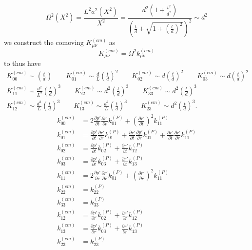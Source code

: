 \documentclass[10pt,letterpaper]{article}
\begin{document}
\begin{equation}
\Omega^2(X^2) = \frac{L^2 a^2(X^2)}{X^2} = \frac{d^2\left(1+\frac{t^2}{d^2}\right)}{\left(\frac{t}{d} + \sqrt{1+\left(\frac{t}{d}\right)^2 }\right)^2} \sim d^2
\end{equation}
we construct the comoving $K^{(cm)}_{\mu\nu}$ as
\begin{equation}
	K^{(cm)}_{\mu\nu} = \Omega^2 k^{(cm)}_{\mu\nu}
\end{equation}
to thus have 
\begin{align}
K^{(cm)}_{00} \sim  \left( \frac{t}{d}^{} \right) \qquad 
K^{(cm)}_{01} \sim  \frac{d}{L}\left( \frac{t}{d} \right)^{2} \qquad 
K^{(cm)}_{02} \sim  d\left( \frac{t}{d} \right)^{2} \qquad 
K^{(cm)}_{03} \sim  d\left( \frac{t}{d} \right)^{2}   \nonumber\\
K^{(cm)}_{11} \sim  \frac{d^2}{L^2}\left( \frac{t}{d} \right)^{3} \qquad 
K^{(cm)}_{22} \sim  d^2\left( \frac{t}{d} \right)^{3} \qquad 
K^{(cm)}_{33}  \sim  d^2\left( \frac{t}{d} \right)^{3} \nonumber\\
K^{(cm)}_{12} \sim  \frac{d^2}{L}\left( \frac{t}{d} \right)^{3} \qquad 
K^{(cm)}_{13} \sim  \frac{d^2}{L}\left( \frac{t}{d} \right)^{3} \qquad  
K^{(cm)}_{23} \sim d^2\left( \frac{t}{d} \right)^3 .
\end{align}
\newpage
\begin{align}
k^{(cm)}_{00} &= 2 \frac{\partial p'}{\partial t} \frac{\partial r'}{\partial t} k^{(P)}_{01} + \left(\frac{\partial r'}{\partial t}\right)^2 k^{(P)}_{11}\nonumber\\
k^{(cm)}_{01} &=\frac{\partial p'}{\partial t} \frac{\partial r'}{\partial r} k^{(P)}_{01}+\frac{\partial r'}{\partial t} \frac{\partial p'}{\partial r} k^{(P)}_{01}+\frac{\partial r'}{\partial t} \frac{\partial r'}{\partial r} k^{(P)}_{11} \nonumber\\
k^{(cm)}_{02} &= \frac{\partial p'}{\partial t} k^{(P)}_{02}+\frac{\partial r'}{\partial t} k^{(P)}_{12} \nonumber\\
k^{(cm)}_{03} &= \frac{\partial p'}{\partial t} k^{(P)}_{03}+\frac{\partial r'}{\partial t} k^{(P)}_{13} \nonumber\\
k^{(cm)}_{11} &=2 \frac{\partial p'}{\partial r} \frac{\partial r'}{\partial r} k^{(P)}_{01}+\left(\frac{\partial r'}{\partial r}\right)^2 k^{(P)}_{11} \nonumber\\
k^{(cm)}_{22} &= k^{(P)}_{22}\nonumber\\
k^{(cm)}_{33} &= k^{(P)}_{33}\nonumber\\
k^{(cm)}_{12} &= \frac{\partial p'}{\partial r} k^{(P)}_{02}+\frac{\partial r'}{\partial r} k^{(P)}_{12} \nonumber\\
k^{(cm)}_{13} &= \frac{\partial p'}{\partial r} k^{(P)}_{03}+\frac{\partial r'}{\partial r} k^{(P)}_{13} \nonumber\\
k^{(cm)}_{23} &= k^{(P)}_{23}
\end{align}
\newpage
\end{document}
